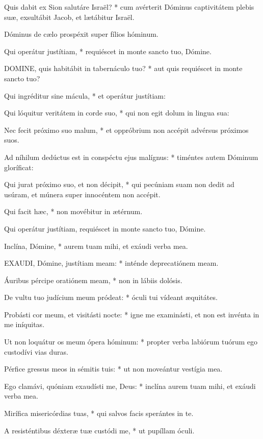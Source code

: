 Quis dabit ex Sion salutáre Israël? * cum avérterit Dóminus captivitátem plebis suæ, exsultábit Jacob, et lætábitur Israël.

 Dóminus de cælo prospéxit super fílios hóminum.

 Qui operátur justítiam, * requiéscet in monte sancto tuo, Dómine.


\lettrine[lines=2]{D}{OMINE}, quis habitábit in tabernáculo tuo? * aut quis requiéscet in monte sancto tuo?

Qui ingréditur sine mácula, * et operátur justítiam:

Qui lóquitur veritátem in corde suo, * qui non egit dolum in lingua sua:

Nec fecit próximo suo malum, * et oppróbrium non accépit advérsus próximos suos.

Ad níhilum dedúctus est in conspéctu ejus malígnus: * timéntes autem Dóminum gloríficat:

Qui jurat próximo suo, et non décipit, * qui pecúniam suam non dedit ad usúram, et múnera super innocéntem non accépit.

Qui facit hæc, * non movébitur in ætérnum.

 Qui operátur justítiam, requiéscet in monte sancto tuo, Dómine.

 Inclína, Dómine, * aurem tuam mihi, et exáudi verba mea.


\lettrine[lines=2]{E}{XAUDI}, Dómine, justítiam meam: * inténde deprecatiónem meam.

Áuribus pércipe oratiónem meam, * non in lábiis dolósis.

De vultu tuo judícium meum pródeat: * óculi tui vídeant æquitátes.

Probásti cor meum, et visitásti nocte: * igne me examinásti, et non est invénta in me iníquitas.

Ut non loquátur os meum ópera hóminum: * propter verba labiórum tuórum ego custodívi vias duras.

Pérfice gressus meos in sémitis tuis: * ut non moveántur vestígia mea.

Ego clamávi, quóniam exaudísti me, Deus: * inclína aurem tuam mihi, et exáudi verba mea.

Mirífica misericórdias tuas, * qui salvos facis sperántes in te.

A resisténtibus déxteræ tuæ custódi me, * ut pupíllam óculi.

